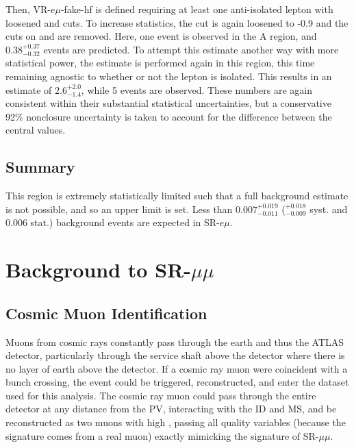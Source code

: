 Then, VR-$e\mu$-fake-hf is defined requiring at least one anti-isolated lepton with loosened \pt and \absdz cuts. To increase statistics, the \dpt cut is again loosened to -0.9 and the cuts on \nprecision and \nphi are removed. Here, one event is observed in the A region, and $0.38^{+0.37}_{-0.32}$ events are predicted. To attempt this estimate another way with more statistical power, the estimate is performed again in this region, this time remaining agnostic to whether or not the lepton is isolated. This results in an estimate of $2.6^{+2.0}_{-1.4}$, while 5 events are observed. These numbers are again consistent within their substantial statistical uncertainties, but a conservative 92\% nonclosure uncertainty is taken to account for the difference between the central values.

\subsection{Summary}
This region is extremely statistically limited such that a full background estimate is not possible, and so an upper limit is set. Less than 
$0.007^{+0.019}_{-0.011}$ ($^{+0.018}_{-0.009}$ syst. and 0.006 stat.) background events are expected in SR-$e\mu$.


\FloatBarrier
\section{Background to SR-$\mu\mu$}

\subsection{Cosmic Muon Identification}
\label{sec:cosmics}
Muons from cosmic rays constantly pass through the earth and thus the \ac{ATLAS} detector, particularly through the service shaft above the detector where there is no layer of earth above the detector. If a cosmic ray muon were coincident with a bunch crossing, the event could be triggered, reconstructed, and enter the dataset used for this analysis. The cosmic ray muon could pass through the entire detector at any distance from the \ac{PV}, interacting with the \ac{ID} and \ac{MS}, and be reconstructed as two muons with high \absdz, passing all quality variables (because the signature comes from a real muon) exactly mimicking the signature of SR-$\mu\mu$. 


